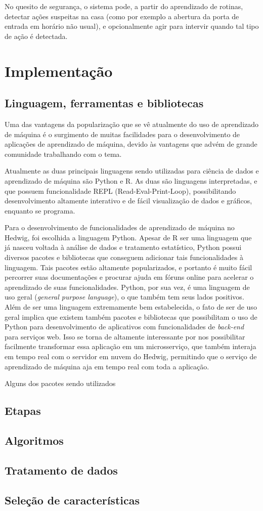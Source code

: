		No quesito de segurança, o sistema pode, a partir do aprendizado de rotinas, detectar ações suspeitas na casa (como por exemplo a abertura da porta de entrada em horário não usual), e opcionalmente agir para intervir quando tal tipo de ação é detectada.


	\section{Implementação}

		\subsection{Linguagem, ferramentas e bibliotecas}

			Uma das vantagens da popularização que se vê atualmente do uso de aprendizado de máquina é o surgimento de muitas facilidades para o desenvolvimento de aplicações de aprendizado de máquina, devido às vantagens que advém de grande comunidade trabalhando com o tema.

			Atualmente as duas principais linguagens sendo utilizadas para ciência de dados e aprendizado de máquina são Python e R. As duas são linguagens interpretadas, e que possuem funcionalidade REPL (Read-Eval-Print-Loop), possibilitando desenvolvimento altamente interativo e de fácil visualização de dados e gráficos, enquanto se programa.

			Para o desenvolvimento de funcionalidades de aprendizado de máquina no Hedwig, foi escolhida a linguagem Python. Apesar de R ser uma linguagem que já nasceu voltada à análise de dados e tratamento estatístico, Python possui diversos pacotes e bibliotecas que conseguem adicionar tais funcionalidades à linguagem. Tais pacotes estão altamente popularizados, e portanto é muito fácil percorrer suas documentações e procurar ajuda em fóruns online para acelerar o aprendizado de suas funcionalidades. Python, por sua vez, é uma linguagem de uso geral (\emph{general purpose language}), o que também tem seus lados positivos. Além de ser uma linguagem extremamente bem estabelecida, o fato de ser de uso geral implica que existem também pacotes e bibliotecas que possibilitam o uso de Python para desenvolvimento de aplicativos com funcionalidades de \emph{back-end} para serviços web. Isso se torna de altamente interessante por nos possibilitar facilmente transformar essa aplicação em um microsserviço, que também interaja em tempo real com o servidor em nuvem do Hedwig, permitindo que o serviço de aprendizado de máquina aja em tempo real com toda a aplicação.

			Alguns dos pacotes sendo utilizados

		\subsection{Etapas}
		\subsection{Algoritmos}
		\subsection{Tratamento de dados}
		\subsection{Seleção de características}
